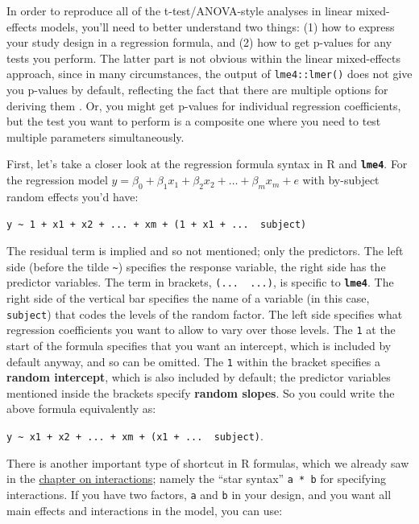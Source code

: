 \documentclass[]{book}
\begin{document}
In order to reproduce all of the t-test/ANOVA-style analyses in linear mixed-effects models, you'll need to better understand two things: (1) how to express your study design in a regression formula, and (2) how to get p-values for any tests you perform. The latter part is not obvious within the linear mixed-effects approach, since in many circumstances, the output of \texttt{lme4::lmer()} does not give you p-values by default, reflecting the fact that there are multiple options for deriving them \citep{Luke_2017}. Or, you might get p-values for individual regression coefficients, but the test you want to perform is a composite one where you need to test multiple parameters simultaneously.

First, let's take a closer look at the regression formula syntax in R and \textbf{\texttt{lme4}}. For the regression model \(y = \beta_0 + \beta_1 x_1 + \beta_2 x_2 + \ldots + \beta_m x_m + e\) with by-subject random effects you'd have:

\texttt{y\ \textasciitilde{}\ 1\ +\ x1\ +\ x2\ +\ ...\ +\ xm\ +\ (1\ +\ x1\ +\ ...\ \textbar{}\ subject)}

The residual term is implied and so not mentioned; only the predictors. The left side (before the tilde \texttt{\textasciitilde{}}) specifies the response variable, the right side has the predictor variables. The term in brackets, \texttt{(...\ \textbar{}\ ...)}, is specific to \textbf{\texttt{lme4}}. The right side of the vertical bar \texttt{\textbar{}} specifies the name of a variable (in this case, \texttt{subject}) that codes the levels of the random factor. The left side specifies what regression coefficients you want to allow to vary over those levels. The \texttt{1} at the start of the formula specifies that you want an intercept, which is included by default anyway, and so can be omitted. The \texttt{1} within the bracket specifies a \textbf{random intercept}, which is also included by default; the predictor variables mentioned inside the brackets specify \textbf{random slopes}. So you could write the above formula equivalently as:

\texttt{y\ \textasciitilde{}\ x1\ +\ x2\ +\ ...\ +\ xm\ +\ (x1\ +\ ...\ \textbar{}\ subject)}.

There is another important type of shortcut in R formulas, which we already saw in the \href{interactions.html}{chapter on interactions}; namely the ``star syntax'' \texttt{a\ *\ b} for specifying interactions. If you have two factors, \texttt{a} and \texttt{b} in your design, and you want all main effects and interactions in the model, you can use:
\end{document}
